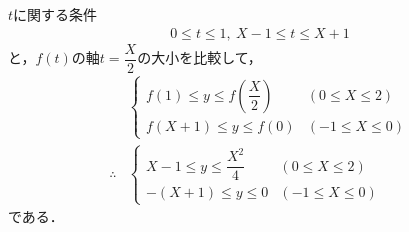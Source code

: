 \documentclass[../../main.tex]{subfiles}
\begin{document}
$t$に関する条件
\begin{align}
  0 \le t \le 1, \ X-1 \le t \le X+1 \label{eq:4}
\end{align}
と，$f(t)$の軸$t=\dfrac{X}{2}$の大小を比較して，
\begin{align}
  &
  \begin{cases}
    f(1) \le y \le f\left(\dfrac{X}{2}\right) & (0 \le X \le 2) \\
    f(X+1) \le y \le f(0) & (-1 \le X \le 0)
  \end{cases} \\
  \therefore
  &
  \begin{cases}
    X-1 \le y \le \dfrac{X^2}{4} & (0 \le X \le 2) \\
    -(X+1) \le y \le 0 & (-1 \le X \le 0)
  \end{cases}
\end{align}
である．
\end{document}
